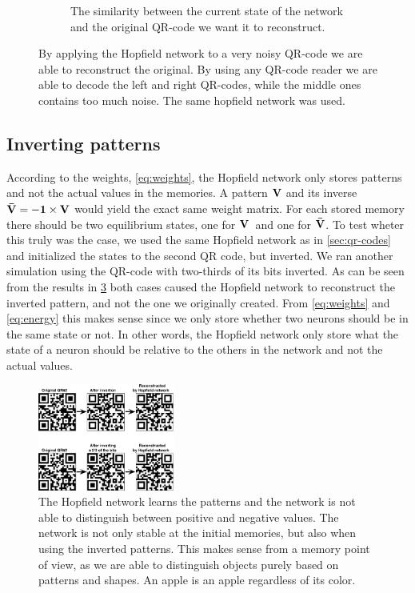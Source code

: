 \begin{figure}[H]
\begin{subfigure}{0.49\textwidth}
        \caption{The similarity between the current state of the network and the original QR-code we want it to reconstruct.}
        \label{fig:qr-codes-stability}
    \end{subfigure}
    \caption{By applying the Hopfield network to a very noisy QR-code we are able to reconstruct the original. By using any QR-code reader we are able to decode the left and right QR-codes, while the middle ones contains too much noise. The same hopfield network was used.}
\end{figure}

\subsection{Inverting patterns}
According to the weights, \cref{eq:weights}, the Hopfield network only stores patterns and not the actual values in the memories. A pattern $\bf V$ and its inverse $\bf \bar{V} = -1 \times \bf V$ would yield the exact same weight matrix. For each stored memory there should be two equilibrium states, one for $\bf V$ and one for $\bf \bar{V}$. To test wheter this truly was the case, we used the same Hopfield network as in \cref{sec:qr-codes} and initialized the states to the second QR code, but inverted. We ran another simulation using the QR-code with two-thirds of its bits inverted. As can be seen from the results in \cref{fig:inverted-qr} both cases caused the Hopfield network to reconstruct the inverted pattern, and not the one we originally created. From \cref{eq:weights} and \cref{eq:energy} this makes sense since we only store whether two neurons should be in the same state or not. In other words, the Hopfield network only store what the state of a neuron should be relative to the others in the network and not the actual values.
\begin{figure}[H]
    \centering
        \includegraphics[width=0.4\textwidth]{figs/qr-inverted}
        \caption{The Hopfield network learns the patterns and the network is not able to distinguish between positive and negative values. The network is not only stable at the initial memories, but also when using the inverted patterns. This makes sense from a memory point of view, as we are able to distinguish objects purely based on patterns and shapes. An apple is an apple regardless of its color.}
        \label{fig:inverted-qr}
\end{figure}